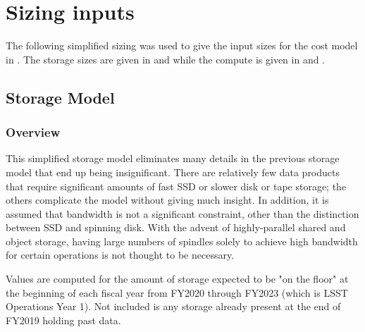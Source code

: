 \section{Sizing inputs}

The following simplified sizing was used to give the input sizes for the cost model in .
The storage sizes are given in  and  while the compute is given in  and .


\subsection{Storage Model}



\subsubsection{Overview}

This simplified storage model eliminates many details in the previous storage model  that end up being insignificant.
There are relatively few data products that require significant amounts of fast SSD or slower disk or tape storage; the others complicate the model without giving much insight.
In addition, it is assumed that bandwidth is not a significant constraint, other than the distinction between SSD and spinning disk.
With the advent of highly-parallel shared and object storage, having large numbers of spindles solely to achieve high bandwidth for certain operations is not thought to be necessary.

Values are computed for the amount of storage expected to be "on the floor" at the beginning of each fiscal year from FY2020 through FY2023 (which is LSST Operations Year 1).
Not included is any storage already present at the end of FY2019 holding past data.


